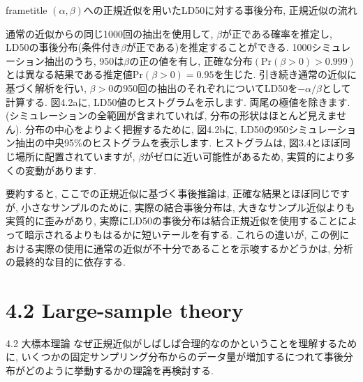 \documentclass[10pt,dvipdfmx,a4]{beamer}
\newcommand{\dbox}[1]{\begin{beamercolorbox}[wd=122mm, sep=0pt, shadow=false, rounded=false]{frametitle} { #1}\end{beamercolorbox}}
\begin{document}

\begin{frame}
\dbox{$(\alpha,\beta)$への正規近似を用いたLD50に対する事後分布, 正規近似の流れ}
通常の近似からの同じ1000回の抽出を使用して, $\beta$が正である確率を推定し, LD50の事後分布(条件付き$\beta$が正である)を推定することができる.
1000シミュレーション抽出のうち, 950は$\beta$の正の値を有し, 正確な分布$(\text{Pr}(\beta>0)>0.999)$とは異なる結果である推定値$\text{Pr}(\beta>0)=0.95$を生じた.
引き続き通常の近似に基づく解析を行い, $\beta>0$の950回の抽出のそれぞれについてLD50を$-\alpha/\beta$として計算する.
図4.2aに, LD50値のヒストグラムを示します.
両尾の極値を除きます.
(シミュレーションの全範囲が含まれていれば, 分布の形状はほとんど見えません).
分布の中心をよりよく把握するために, 図4.2bに, LD50の950シミュレーション抽出の中央95\%のヒストグラムを表示します.
ヒストグラムは, 図3.4とほぼ同じ場所に配置されていますが, $\beta$がゼロに近い可能性があるため, 実質的により多くの変動があります.

要約すると, ここでの正規近似に基づく事後推論は, 正確な結果とほぼ同じですが, 小さなサンプルのために, 実際の結合事後分布は, 大きなサンプル近似よりも実質的に歪みがあり, 実際にLD50の事後分布は結合正規近似を使用することによって暗示されるよりもはるかに短いテールを有する.
これらの違いが, この例における実際の使用に通常の近似が不十分であることを示唆するかどうかは, 分析の最終的な目的に依存する.
\end{frame}

\section{4.2 Large-sample theory}
\begin{frame}{4.2 大標本理論}
なぜ正規近似がしばしば合理的なのかということを理解するために, いくつかの固定サンプリング分布からのデータ量が増加するにつれて事後分布がどのように挙動するかの理論を再検討する.
\end{frame}

\end{document}
